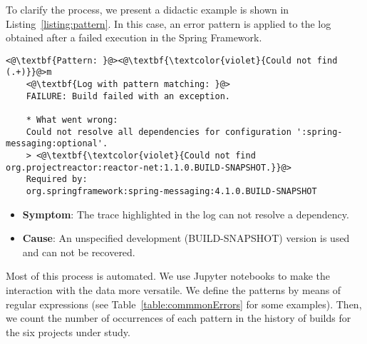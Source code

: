 
To clarify the process, we present a didactic example is shown in Listing~\ref{listing:pattern}.
In this case, an error pattern is applied to the log obtained after a failed execution in the Spring Framework.

\begin{center}
	\begin{lstlisting}[linewidth=\linewidth, caption={SpringFramework Log - Commit 8961}, captionpos=b, label={listing:pattern}]
	<@\textbf{Pattern: }@><@\textbf{\textcolor{violet}{Could not find (.+)}}@>m
	<@\textbf{Log with pattern matching: }@>
	FAILURE: Build failed with an exception.
	
	* What went wrong:
	Could not resolve all dependencies for configuration ':spring-messaging:optional'.
	> <@\textbf{\textcolor{violet}{Could not find org.projectreactor:reactor-net:1.1.0.BUILD-SNAPSHOT.}}@>
	Required by:
	org.springframework:spring-messaging:4.1.0.BUILD-SNAPSHOT
	\end{lstlisting}
\end{center}


\begin{itemize}
	\item \textbf{{Symptom}}: The trace highlighted in the log can not resolve a dependency.
	\item \textbf{{Cause}}: An unspecified development (BUILD-SNAPSHOT) version is used and can not be recovered.
\end{itemize}




Most of this process is automated.
We use Jupyter notebooks to make the interaction with the data more versatile.
We define the patterns by means of regular expressions (see Table~\ref{table:commmonErrors} for some examples).
Then, we count the number of occurrences of each pattern in the history of builds for the six projects under study.

